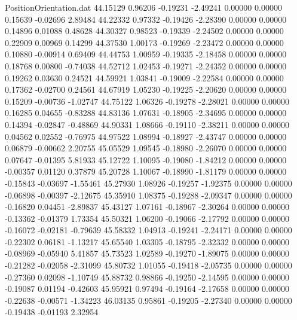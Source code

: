 \begin{filecontents}{PositionOrientation.dat}
  44.15129    0.96206   -0.19231    -2.49241    0.00000    0.00000    0.15639   -0.02696    2.89484
  44.22332    0.97332   -0.19426    -2.28390    0.00000    0.00000    0.14896    0.01088    0.48628
  44.30327    0.98523   -0.19339    -2.24502    0.00000    0.00000    0.22909    0.00969    0.14299
  44.37530    1.00173   -0.19269    -2.23472    0.00000    0.00000    0.10880   -0.00914    0.69409
  44.44753    1.00959   -0.19335    -2.18458    0.00000    0.00000    0.18768    0.00800   -0.74038
  44.52712    1.02453   -0.19271    -2.24352    0.00000    0.00000    0.19262    0.03630    0.24521
  44.59921    1.03841   -0.19009    -2.22584    0.00000    0.00000    0.17362   -0.02700    0.24561
  44.67919    1.05230   -0.19225    -2.20620    0.00000    0.00000    0.15209   -0.00736   -1.02747
  44.75122    1.06326   -0.19278    -2.28021    0.00000    0.00000    0.16285    0.04655   -0.83288
  44.83136    1.07631   -0.18905    -2.34695    0.00000    0.00000    0.14394   -0.02847   -0.48869
  44.90331    1.08666   -0.19110    -2.38211    0.00000    0.00000    0.04562    0.02552   -0.76975
  44.97522    1.08994   -0.18927    -2.43747    0.00000    0.00000    0.06879   -0.00662    2.20755
  45.05529    1.09545   -0.18980    -2.26070    0.00000    0.00000    0.07647   -0.01395    5.81933
  45.12722    1.10095   -0.19080    -1.84212    0.00000    0.00000   -0.00357    0.01120    0.37879
  45.20728    1.10067   -0.18990    -1.81179    0.00000    0.00000   -0.15843   -0.03697   -1.55461
  45.27930    1.08926   -0.19257    -1.92375    0.00000    0.00000   -0.06898   -0.00397   -2.12675
  45.35910    1.08375   -0.19288    -2.09347    0.00000    0.00000   -0.16820    0.04451   -2.89837
  45.43127    1.07161   -0.18967    -2.30264    0.00000    0.00000   -0.13362   -0.01379    1.73354
  45.50321    1.06200   -0.19066    -2.17792    0.00000    0.00000   -0.16072   -0.02181   -0.79639
  45.58332    1.04913   -0.19241    -2.24171    0.00000    0.00000   -0.22302    0.06181   -1.13217
  45.65540    1.03305   -0.18795    -2.32332    0.00000    0.00000   -0.08969   -0.05940    5.41857
  45.73523    1.02589   -0.19270    -1.89075    0.00000    0.00000   -0.21282   -0.02058   -2.31099
  45.80732    1.01055   -0.19418    -2.05735    0.00000    0.00000   -0.27360    0.02098   -1.10749
  45.88732    0.98866   -0.19250    -2.14595    0.00000    0.00000   -0.19087    0.01194   -0.42603
  45.95921    0.97494   -0.19164    -2.17658    0.00000    0.00000   -0.22638   -0.00571   -1.34223
  46.03135    0.95861   -0.19205    -2.27340    0.00000    0.00000   -0.19438   -0.01193    2.32954

\end{filecontents}
